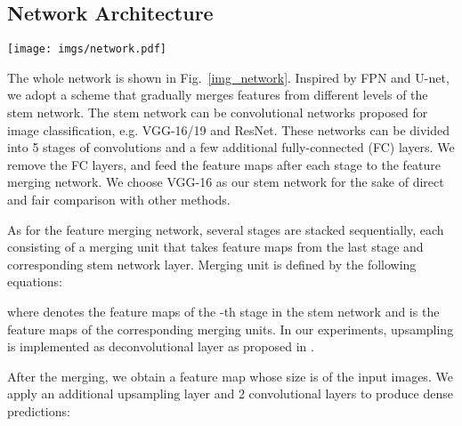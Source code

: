 \documentclass[runningheads]{llncs}
\begin{document}
\subsection{Network Architecture}

\begin{figure*}
\begin{centering}
\texttt{[image: imgs/network.pdf]}
\par\end{centering}
\vspace{-7mm}
\caption{Network Architecture. Blue blocks are convolution stages of VGG-16.}
\label{img_network}
\end{figure*}




The whole network is shown in Fig.~\ref{img_network}. Inspired by FPN\cite{Lin_2017_CVPR} and U-net\cite{Ronneberger2015U}, we adopt a scheme that gradually merges features from different levels of the stem network. The stem network can be convolutional networks proposed for image classification, e.g. VGG-16/19\cite{simonyan2014very} and ResNet\cite{He_2017_Res}. These networks can be divided into 5 stages of convolutions and a few additional fully-connected (FC) layers. We remove the FC layers, and feed the feature maps after each stage to the feature merging network. We choose VGG-16 as our stem network for the sake of direct and fair comparison with other methods. 

As for the feature merging network, several stages are stacked sequentially, each consisting of a merging unit that takes feature maps from the last stage and corresponding stem network layer. Merging unit is defined by the following equations:



\vspace{-2mm}

\vspace{-2mm}

where  denotes the feature maps of the -th stage in the stem network and  is the feature maps of the corresponding merging units. In our experiments, upsampling is implemented as deconvolutional layer as proposed in \cite{Zeiler2010Deconvolutional}. 




After the merging, we obtain a feature map whose size is  of the input images. We apply an additional upsampling layer and 2 convolutional layers to produce dense predictions:


\vspace{-2mm}
\end{document}
